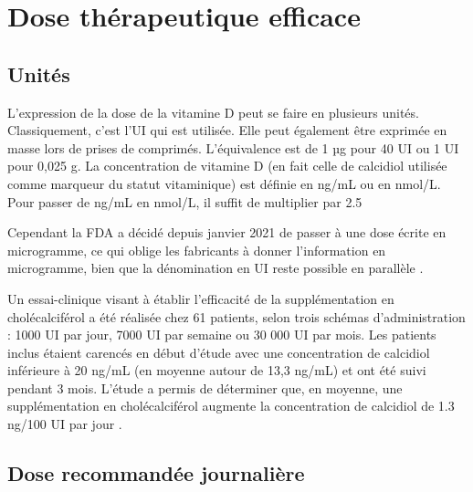 \documentclass[
  a4paper,
  DIV=11,
  numbers=noendperiod,
  listof=totoc]{scrreprt}
\begin{document}
\section{Dose thérapeutique
efficace}\label{dose-thuxe9rapeutique-efficace}

\subsection{Unités}\label{unituxe9s}

L'expression de la dose de la vitamine D peut se faire en plusieurs
unités. Classiquement, c'est l'\ac{UI} qui est utilisée. Elle peut
également être exprimée en masse lors de prises de comprimés.
L'équivalence est de 1 µg pour 40 \ac{UI} ou 1 \ac{UI} pour 0,025 g. La
concentration de vitamine D (en fait celle de calcidiol utilisée comme
marqueur du statut vitaminique) est définie en ng/mL ou en nmol/L. Pour
passer de ng/mL en nmol/L, il suffit de multiplier par 2.5
\autocite{Pramyothin.2012}

Cependant la \ac{FDA} a décidé depuis janvier 2021 de passer à une dose
écrite en microgramme, ce qui oblige les fabricants à donner
l'information en microgramme, bien que la dénomination en UI reste
possible en parallèle \autocite{HHS.2016}.

Un essai-clinique visant à établir l'efficacité de la supplémentation en
cholécalciférol a été réalisée chez 61 patients, selon trois schémas
d'administration : 1000 UI par jour, 7000 UI par semaine ou 30 000 UI
par mois. Les patients inclus étaient carencés en début d'étude avec une
concentration de calcidiol inférieure à 20 ng/mL (en moyenne autour de
13,3 ng/mL) et ont été suivi pendant 3 mois. L'étude a permis de
déterminer que, en moyenne, une supplémentation en cholécalciférol
augmente la concentration de calcidiol de 1.3 ng/100 UI par jour
\autocite{Takács.2017}.

\subsection{Dose recommandée
journalière}\label{dose-recommanduxe9e-journaliuxe8re}
\end{document}
